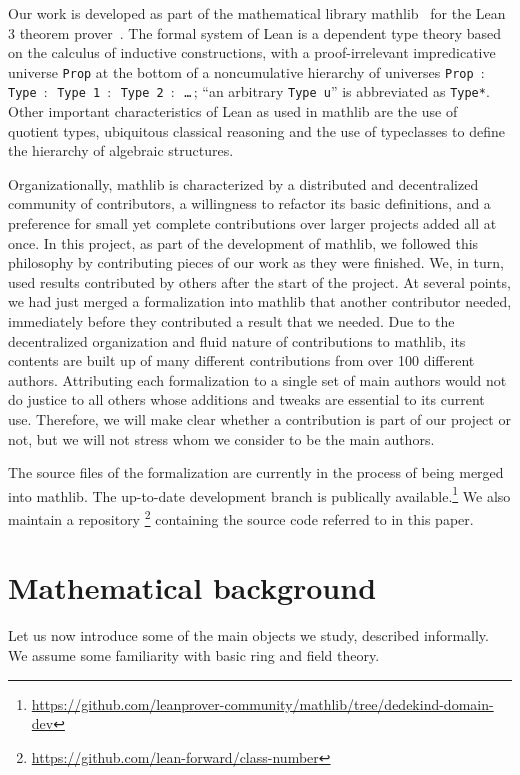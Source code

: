 \documentclass[a4paper,USenglish,cleveref, autoref, thm-restate]{lipics-v2021}
\newcommand{\lean}[1]{\texttt{#1}\xspace}
\newcommand{\mathlib}{\textsf{mathlib}\xspace}
\begin{document}
Our work is developed as part of the mathematical library \mathlib~\cite{mathlib} for the Lean 3 theorem prover~\cite{lean-prover}.
The formal system of Lean is a dependent type theory based on the calculus of inductive constructions,
with a proof-irrelevant impredicative universe \lean{Prop} at the bottom of a noncumulative hierarchy of universes \lean{Prop $:$ Type $:$ Type 1 $:$ \mbox{Type 2} $:$ \dots}\,; ``an arbitrary \lean{Type u}'' is abbreviated as \lean{Type*}.
Other important characteristics of Lean as used in \mathlib are the use of quotient types, ubiquitous classical reasoning and the use of typeclasses to define the hierarchy of algebraic structures.

Organizationally, \mathlib is characterized by a distributed and decentralized community of contributors, a willingness to refactor its basic definitions, and a preference for small yet complete contributions over larger projects added all at once.
In this project, as part of the development of \mathlib, we followed this philosophy by contributing pieces of our work as they were finished.
We, in turn, used results contributed by others after the start of the project.
At several points, we had just merged a formalization into \mathlib that another contributor needed,
immediately before they contributed a result that we needed.
Due to the decentralized organization and fluid nature of contributions to \mathlib, its contents are built up of many different contributions from over 100 different authors.
Attributing each formalization to a single set of main authors would not do justice to all others whose additions and tweaks are essential to its current use. Therefore, we will make clear whether a contribution is part of our project or not, but we will not stress whom we consider to be the main authors.

The source files of the formalization are currently in the process of being merged into \mathlib.
The up-to-date development branch is publically available.\footnote{\url{https://github.com/leanprover-community/mathlib/tree/dedekind-domain-dev}}
We also maintain a
repository%
\footnote{\url{https://github.com/lean-forward/class-number}}
containing the source code referred to in this paper.

\section{Mathematical background}\label{sec math background}

Let us now introduce some of the main objects we study, described informally. We assume some familiarity with basic ring and field theory.
\end{document}
